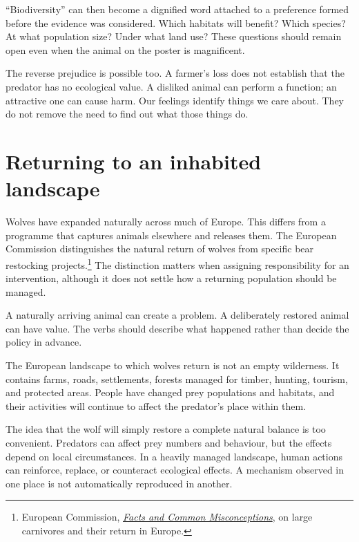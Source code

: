 \documentclass[12pt,a4paper]{book}
\begin{document}
``Biodiversity'' can then become a dignified word attached to a preference formed before the evidence was considered. Which habitats will benefit? Which species? At what population size? Under what land use? These questions should remain open even when the animal on the poster is magnificent.

The reverse prejudice is possible too. A farmer's loss does not establish that the predator has no ecological value. A disliked animal can perform a function; an attractive one can cause harm. Our feelings identify things we care about. They do not remove the need to find out what those things do.

\section*{Returning to an inhabited landscape}

Wolves have expanded naturally across much of Europe. This differs from a programme that captures animals elsewhere and releases them. The European Commission distinguishes the natural return of wolves from specific bear restocking projects.\footnote{European Commission, \href{https://environment.ec.europa.eu/topics/nature-and-biodiversity/habitats-directive/large-carnivores/eu-large-carnivore-platform/facts-and-common-misconceptions_en}{\emph{Facts and Common Misconceptions}}, on large carnivores and their return in Europe.} The distinction matters when assigning responsibility for an intervention, although it does not settle how a returning population should be managed.

A naturally arriving animal can create a problem. A deliberately restored animal can have value. The verbs should describe what happened rather than decide the policy in advance.

The European landscape to which wolves return is not an empty wilderness. It contains farms, roads, settlements, forests managed for timber, hunting, tourism, and protected areas. People have changed prey populations and habitats, and their activities will continue to affect the predator's place within them.

The idea that the wolf will simply restore a complete natural balance is too convenient. Predators can affect prey numbers and behaviour, but the effects depend on local circumstances. In a heavily managed landscape, human actions can reinforce, replace, or counteract ecological effects. A mechanism observed in one place is not automatically reproduced in another.
\end{document}
